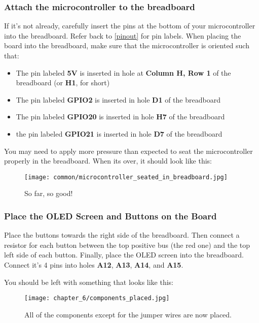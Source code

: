 \subsubsection{Attach the microcontroller to the breadboard}
If it's not already, carefully insert the pins at the bottom of your microcontroller into the breadboard. Refer back
to \ref{pinout} for pin labels. When placing the board into the breadboard, make sure that the microcontroller is oriented such that:
\begin{itemize}
    \item The pin labeled \textbf{5V} is inserted in hole at \textbf{Column H, Row 1} of the breadboard (or \textbf{H1}, for short)
    \item The pin labeled \textbf{GPIO2} is inserted in hole \textbf{D1} of the breadboard
    \item The pin labeled \textbf{GPIO20} is inserted in hole \textbf{H7} of the breadboard
    \item the pin labeled \textbf{GPIO21} is inserted in hole \textbf{D7} of the breadboard
\end{itemize}
You may need to apply more pressure than expected to seat the microcontroller properly in the breadboard. When its over, it should look like this:
\begin{figure}[H]
    \centering
    \texttt{[image: common/microcontroller\_seated\_in\_breadboard.jpg]}
    \caption{So far, so good!}
\end{figure}

\subsubsection{Place the OLED Screen and Buttons on the Board}
Place the buttons towards the right side of the breadboard. Then connect a resistor for each button between the top positive
bus (the red one) and the top left side of each button. Finally, place the OLED screen into the breadboard. Connect
it's 4 pins into holes \textbf{A12}, \textbf{A13}, \textbf{A14}, and \textbf{A15}.

You should be left with something that looks like this:
\begin{figure}[H]
    \centering
    \texttt{[image: chapter\_6/components\_placed.jpg]}
    \caption{All of the components except for the jumper wires are now placed.}
\end{figure}

